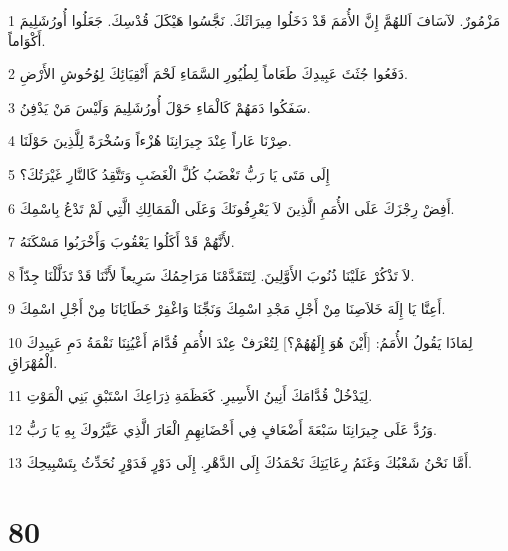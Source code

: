 \par 1 مَزْمُورٌ. لآسَافَ اَللهُمَّ إِنَّ الأُمَمَ قَدْ دَخَلُوا مِيرَاثَكَ. نَجَّسُوا هَيْكَلَ قُدْسِكَ. جَعَلُوا أُورُشَلِيمَ أَكْوَاماً.
\par 2 دَفَعُوا جُثَثَ عَبِيدِكَ طَعَاماً لِطُيُورِ السَّمَاءِ لَحْمَ أَتْقِيَائِكَ لِوُحُوشِ الأَرْضِ.
\par 3 سَفَكُوا دَمَهُمْ كَالْمَاءِ حَوْلَ أُورُشَلِيمَ وَلَيْسَ مَنْ يَدْفِنُ.
\par 4 صِرْنَا عَاراً عِنْدَ جِيرَانِنَا هُزْءاً وَسُخْرَةً لِلَّذِينَ حَوْلَنَا.
\par 5 إِلَى مَتَى يَا رَبُّ تَغْضَبُ كُلَّ الْغَضَبِ وَتَتَّقِدُ كَالنَّارِ غَيْرَتُكَ؟
\par 6 أَفِضْ رِجْزَكَ عَلَى الأُمَمِ الَّذِينَ لاَ يَعْرِفُونَكَ وَعَلَى الْمَمَالِكِ الَّتِي لَمْ تَدْعُ بِاسْمِكَ.
\par 7 لأَنَّهُمْ قَدْ أَكَلُوا يَعْقُوبَ وَأَخْرَبُوا مَسْكَنَهُ.
\par 8 لاَ تَذْكُرْ عَلَيْنَا ذُنُوبَ الأَوَّلِينَ. لِتَتَقَدَّمْنَا مَرَاحِمُكَ سَرِيعاً لأَنَّنَا قَدْ تَذَلَّلْنَا جِدّاً.
\par 9 أَعِنَّا يَا إِلَهَ خَلاَصِنَا مِنْ أَجْلِ مَجْدِ اسْمِكَ وَنَجِّنَا وَاغْفِرْ خَطَايَانَا مِنْ أَجْلِ اسْمِكَ.
\par 10 لِمَاذَا يَقُولُ الأُمَمُ: [أَيْنَ هُوَ إِلَهُهُمْ؟] لِتُعْرَفْ عِنْدَ الأُمَمِ قُدَّامَ أَعْيُنِنَا نَقْمَةُ دَمِ عَبِيدِكَ الْمُهْرَاقِ.
\par 11 لِيَدْخُلْ قُدَّامَكَ أَنِينُ الأَسِيرِ. كَعَظَمَةِ ذِرَاعِكَ اسْتَبْقِ بَنِي الْمَوْتِ.
\par 12 وَرُدَّ عَلَى جِيرَانِنَا سَبْعَةَ أَضْعَافٍ فِي أَحْضَانِهِمِ الْعَارَ الَّذِي عَيَّرُوكَ بِهِ يَا رَبُّ.
\par 13 أَمَّا نَحْنُ شَعْبُكَ وَغَنَمُ رِعَايَتِكَ نَحْمَدُكَ إِلَى الدَّهْرِ. إِلَى دَوْرٍ فَدَوْرٍ نُحَدِّثُ بِتَسْبِيحِكَ.

\chapter{80}

